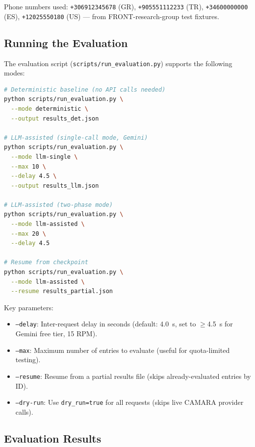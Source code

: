 \documentclass[conference]{IEEEtran}
\begin{document}
Phone numbers used: \texttt{+306912345678} (GR), \texttt{+905551112233} (TR),
\texttt{+34600000000} (ES), \texttt{+12025550180} (US) — from
FRONT-research-group test fixtures.

\subsection{Running the Evaluation}

The evaluation script (\texttt{scripts/run\_evaluation.py}) supports the
following modes:

\begin{lstlisting}[language=bash]
# Deterministic baseline (no API calls needed)
python scripts/run_evaluation.py \
  --mode deterministic \
  --output results_det.json

# LLM-assisted (single-call mode, Gemini)
python scripts/run_evaluation.py \
  --mode llm-single \
  --max 10 \
  --delay 4.5 \
  --output results_llm.json

# LLM-assisted (two-phase mode)
python scripts/run_evaluation.py \
  --mode llm-assisted \
  --max 20 \
  --delay 4.5

# Resume from checkpoint
python scripts/run_evaluation.py \
  --mode llm-assisted \
  --resume results_partial.json
\end{lstlisting}

Key parameters:
\begin{itemize}[leftmargin=1.2em]
  \item \texttt{--delay}: Inter-request delay in seconds (default: 4.0~s,
        set to $\geq$4.5~s for Gemini free tier, 15 RPM).
  \item \texttt{--max}: Maximum number of entries to evaluate
        (useful for quota-limited testing).
  \item \texttt{--resume}: Resume from a partial results file
        (skips already-evaluated entries by ID).
  \item \texttt{--dry-run}: Use \texttt{dry\_run=true} for all requests
        (skips live CAMARA provider calls).
\end{itemize}

\subsection{Evaluation Results}
\label{subsec:results}
\end{document}
